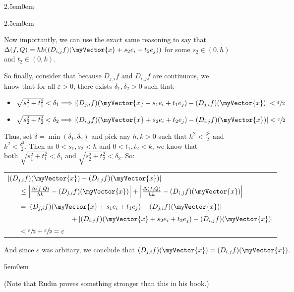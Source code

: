 \documentclass{book}
\newcommand{\myComment}{%
   \color{RawerSienna}%
   \fontsize{12}{14}\selectfont%
}
\newenvironment{myIndent}{%
   \begin{adjustwidth}{2.5em}{0em}%
}{%
   \end{adjustwidth}%
}
\newenvironment{myDindent}{%
   \begin{adjustwidth}{5em}{0em}%
}{%
   \end{adjustwidth}%
}
\newcommand{\retTwo}{\hfill\bigbreak}
\newcommand{\mVec}[1]{\myVector{#1}}
\begin{document}
{\begin{myIndent}
\begin{myIndent}
      Now importantly,  we can use the exact same reasoning to say that\\ $\Delta(f, Q) = hk((D_{i,j}f)(\mVec{x} + s_2e_i + t_2e_j))$ for some $s_2 \in (0, h)$\\ and $t_2 \in (0, k)$.\retTwo

      So finally, consider that because $D_{j,i}f$ and $D_{i,j}f$ are continuous, we\\ know that for all $\varepsilon > 0$, there exists $\delta_1, \delta_2 > 0$ such that:
      \begin{itemize}
         \item {\fontsize{12}{14} $\sqrt{s_1^2 + t_1^2} < \delta_1 \Longrightarrow \left|(D_{j,i}f)(\mVec{x} + s_1e_i + t_1e_j) - (D_{j,i}f)(\mVec{x})\right| < \sfrac{\varepsilon}{2}$}
         \item {\fontsize{12}{14} $\sqrt{s_2^2 + t_2^2} < \delta_2 \Longrightarrow \left|(D_{i,j}f)(\mVec{x} + s_2e_i + t_2e_j) - (D_{i,j}f)(\mVec{x})\right| < \sfrac{\varepsilon}{2}$}
      \end{itemize}\retTwo

      Thus, set $\delta = \min(\delta_1, \delta_2)$ and pick any $h, k > 0$ such that $h^2 < \frac{\delta^2}{2}$ and\\ $k^2 < \frac{\delta^2}{2}$. Then as $0 < s_1, s_2 < h$ and $0 < t_1, t_2 < k$, we know that\\ both $\sqrt{s_1^2 + t_1^2} < \delta_1$ and $\sqrt{s_2^2 + t_2^2} < \delta_2$. So:\\ 

      \begin{center}{\fontsize{11}{13}\selectfont}
         \begin{tabular}{l}
            $|(D_{j,i}f)(\mVec{x}) - (D_{i,j}f)(\mVec{x})|$\\ [6pt]
            $\phantom{aaa} \leq \left|\frac{\Delta(f, Q)}{hk} - (D_{j,i}f)(\mVec{x})\right| + \left|\frac{\Delta(f, Q)}{hk} - (D_{i,j}f)(\mVec{x})\right|$\\ [6pt]
            $\phantom{aaa} = \left|(D_{j,i}f)(\mVec{x} + s_1e_i + t_1e_j) - (D_{j,i}f)(\mVec{x})\right|$\\ [2pt]
            $\phantom{aaaaaaaaaaaaaaaaa} + \left|(D_{i,j}f)(\mVec{x} + s_2e_i + t_2e_j) - (D_{i,j}f)(\mVec{x})\right|$\\
            $\phantom{aaa} < \sfrac{\varepsilon}{2} + \sfrac{\varepsilon}{2} = \varepsilon$
         \end{tabular}\retTwo
      \end{center}

      And since $\varepsilon$ was arbitary, we conclude that $(D_{j,i}f)(\mVec{x}) = (D_{i,j}f)(\mVec{x})$.
      {\begin{myDindent}\myComment
         (Note that Rudin proves something stronger than this in his book.)
      \end{myDindent}}
   \end{myIndent}
\end{myIndent}}
\end{document}

